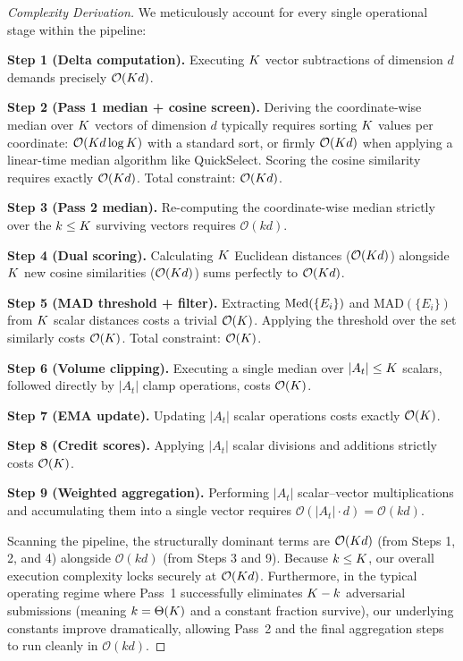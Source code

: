 \documentclass[../main.tex]{subfiles}
\begin{document}
\begin{proof}[Complexity Derivation]
We meticulously account for every single operational stage within the pipeline:

\textbf{Step 1 (Delta computation).}
Executing $K$ vector subtractions of dimension $d$ demands precisely $\mathcal{O}(K d)$.

\textbf{Step 2 (Pass 1 median + cosine screen).}
Deriving the coordinate-wise median over $K$ vectors of dimension $d$ typically requires sorting $K$ values per coordinate: $\mathcal{O}(K d\log K)$ with a standard sort, or firmly $\mathcal{O}(K d)$ when applying a linear-time median algorithm like QuickSelect. Scoring the cosine similarity requires exactly $\mathcal{O}(K d)$. Total constraint: $\mathcal{O}(K d)$.

\textbf{Step 3 (Pass 2 median).}
Re-computing the coordinate-wise median strictly over the $k \leq K$ surviving vectors requires $\mathcal{O}(kd)$.

\textbf{Step 4 (Dual scoring).}
Calculating $K$ Euclidean distances ($\mathcal{O}(K d)$) alongside $K$ new cosine similarities ($\mathcal{O}(K d)$) sums perfectly to $\mathcal{O}(K d)$.

\textbf{Step 5 (MAD threshold + filter).}
Extracting $\operatorname{Med}(\{E_i\})$ and $\mathrm{MAD}(\{E_i\})$ from $K$ scalar distances costs a trivial $\mathcal{O}(K)$. Applying the threshold over the set similarly costs $\mathcal{O}(K)$. Total constraint: $\mathcal{O}(K)$.

\textbf{Step 6 (Volume clipping).}
Executing a single median over $|A_t| \leq K$ scalars, followed directly by $|A_t|$ clamp operations, costs $\mathcal{O}(K)$.

\textbf{Step 7 (EMA update).}
Updating $|A_t|$ scalar operations costs exactly $\mathcal{O}(K)$.

\textbf{Step 8 (Credit scores).}
Applying $|A_t|$ scalar divisions and additions strictly costs $\mathcal{O}(K)$.

\textbf{Step 9 (Weighted aggregation).}
Performing $|A_t|$ scalar--vector multiplications and accumulating them into a single vector requires $\mathcal{O}(|A_t| \cdot d) = \mathcal{O}(kd)$.

Scanning the pipeline, the structurally dominant terms are $\mathcal{O}(K d)$ (from Steps 1, 2, and 4) alongside $\mathcal{O}(kd)$ (from Steps 3 and 9). Because $k \leq K$, our overall execution complexity locks securely at $\mathcal{O}(K d)$. Furthermore, in the typical operating regime where Pass~1 successfully eliminates $K - k$ adversarial submissions (meaning $k = \Theta(K)$ and a constant fraction survive), our underlying constants improve dramatically, allowing Pass~2 and the final aggregation steps to run cleanly in $\mathcal{O}(kd)$.


\end{proof}
\end{document}

